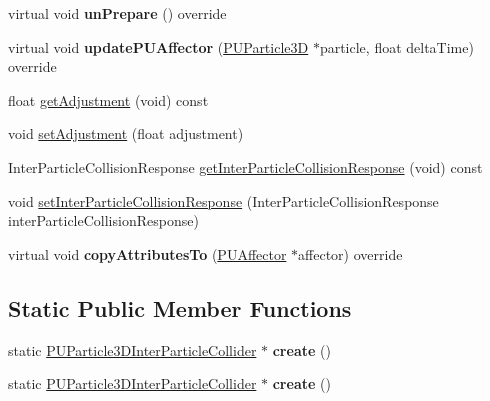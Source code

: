 \begin{DoxyCompactItemize}
\mbox{\label{classPUParticle3DInterParticleCollider_a12ecff0034b797fda9c5ad07b87390a8}} 
virtual void {\bfseries un\+Prepare} () override
\item 
\mbox{\label{classPUParticle3DInterParticleCollider_adc9fb3946ede38bfa3317ffeed95bced}} 
virtual void {\bfseries update\+P\+U\+Affector} (\hyperlink{structPUParticle3D}{P\+U\+Particle3D} $\ast$particle, float delta\+Time) override
\item 
float \hyperlink{classPUParticle3DInterParticleCollider_a7368e91519b1d0b86ab39e03454c3b93}{get\+Adjustment} (void) const
\item 
void \hyperlink{classPUParticle3DInterParticleCollider_a9b14f7d946c5129dec882a4bb39f47b4}{set\+Adjustment} (float adjustment)
\item 
Inter\+Particle\+Collision\+Response \hyperlink{classPUParticle3DInterParticleCollider_a3447ec931fd7e807dd2863c951eab96b}{get\+Inter\+Particle\+Collision\+Response} (void) const
\item 
void \hyperlink{classPUParticle3DInterParticleCollider_ad39dd75ace38589685b39329af1a38ea}{set\+Inter\+Particle\+Collision\+Response} (Inter\+Particle\+Collision\+Response inter\+Particle\+Collision\+Response)
\item 
\mbox{\label{classPUParticle3DInterParticleCollider_af7eed46553a5c6bbbb700d1920cddc2c}} 
virtual void {\bfseries copy\+Attributes\+To} (\hyperlink{classPUAffector}{P\+U\+Affector} $\ast$affector) override
\end{DoxyCompactItemize}
\subsection*{Static Public Member Functions}
\begin{DoxyCompactItemize}
\item 
\mbox{\label{classPUParticle3DInterParticleCollider_a9b49877c1a196807f501871d9ed34303}} 
static \hyperlink{classPUParticle3DInterParticleCollider}{P\+U\+Particle3\+D\+Inter\+Particle\+Collider} $\ast$ {\bfseries create} ()
\item 
\mbox{\label{classPUParticle3DInterParticleCollider_a4f8f62aca2cefd3822ef547ffff82924}} 
static \hyperlink{classPUParticle3DInterParticleCollider}{P\+U\+Particle3\+D\+Inter\+Particle\+Collider} $\ast$ {\bfseries create} ()
\end{DoxyCompactItemize}
